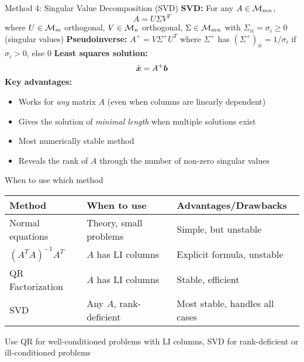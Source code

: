 \documentclass[aspectratio=169]{beamer}\usepackage[]{graphicx}\usepackage[]{xcolor}
\begin{document}
\begin{frame}{Method 4: Singular Value Decomposition (SVD)}
\textbf{SVD:} For any $A\in\mathcal{M}_{mn}$,
$$A = U\Sigma V^T$$
where $U\in\mathcal{M}_m$ orthogonal, $V\in\mathcal{M}_n$ orthogonal, $\Sigma\in\mathcal{M}_{mn}$ with $\Sigma_{ii} = \sigma_i \geq 0$ (singular values)
\vfill
\textbf{Pseudoinverse:} $A^+ = V\Sigma^+ U^T$ where $\Sigma^+$ has $(\Sigma^+)_{ii} = 1/\sigma_i$ if $\sigma_i > 0$, else $0$
\vfill
\textbf{Least squares solution:}
$$\tilde{\bm{x}} = A^+\bm{b}$$
\vfill
\textbf{Key advantages:}
\begin{itemize}
\item Works for \emph{any} matrix $A$ (even when columns are linearly dependent)
\item Gives the solution of \emph{minimal length} when multiple solutions exist
\item Most numerically stable method
\item Reveals the rank of $A$ through the number of non-zero singular values
\end{itemize}
\end{frame}

\begin{frame}{When to use which method}
\begin{center}
\begin{tabular}{|l|l|l|}
\hline
\textbf{Method} & \textbf{When to use} & \textbf{Advantages/Drawbacks} \\
\hline
Normal equations & Theory, small problems & Simple, but unstable \\
\hline
$(A^TA)^{-1}A^T$ & $A$ has LI columns & Explicit formula, unstable \\
\hline
QR Factorization & $A$ has LI columns & Stable, efficient \\
\hline
SVD & Any $A$, rank-deficient & Most stable, handles all cases \\
\hline
\end{tabular}
\end{center}
\vfill
Use QR for well-conditioned problems with LI columns, SVD for rank-deficient or ill-conditioned problems
\end{frame}


\end{document}

